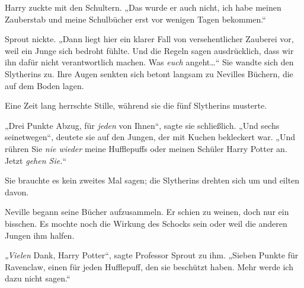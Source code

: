 Harry zuckte mit den Schultern. „Das wurde er auch nicht, ich habe meinen Zauberstab und meine Schulbücher erst vor wenigen Tagen bekommen.“

Sprout nickte. „Dann liegt hier ein klarer Fall von versehentlicher Zauberei vor, weil ein Junge sich bedroht fühlte. Und die Regeln sagen ausdrücklich, dass wir ihn dafür nicht verantwortlich machen. Was \emph{euch} angeht…“ Sie wandte sich den Slytherins zu. Ihre Augen senkten sich betont langsam zu Nevilles Büchern, die auf dem Boden lagen.

Eine Zeit lang herrschte Stille, während sie die fünf Slytherins musterte.

„Drei Punkte Abzug, für \emph{jeden} von Ihnen“, sagte sie schließlich. „Und sechs seinetwegen“, deutete sie auf den Jungen, der mit Kuchen bekleckert war. „Und rühren Sie \emph{nie wieder} meine Hufflepuffs oder meinen Schüler Harry Potter an. Jetzt \emph{gehen Sie.}“

Sie brauchte es kein zweites Mal sagen; die Slytherins drehten sich um und eilten davon.

Neville begann seine Bücher aufzusammeln. Er schien zu weinen, doch nur ein bisschen. Es mochte noch die Wirkung des Schocks sein oder weil die anderen Jungen ihm halfen.

\emph{„Vielen} Dank, Harry Potter“, sagte Professor Sprout zu ihm. „Sieben Punkte für Ravenclaw, einen für jeden Hufflepuff, den sie beschützt haben. Mehr werde ich dazu nicht sagen.“

